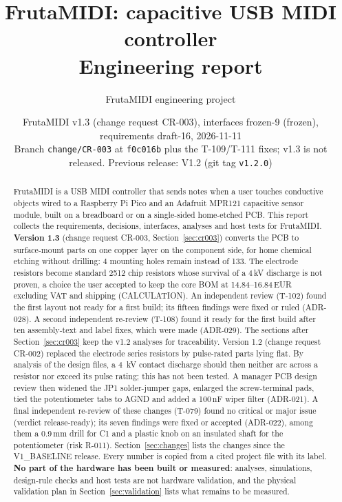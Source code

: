 \documentclass[11pt,a4paper]{article}
\title{FrutaMIDI: capacitive USB MIDI controller\\[2pt]\large Engineering report}
\author{FrutaMIDI engineering project}
\date{FrutaMIDI v1.3 (change request CR-003), interfaces frozen-9 (frozen), requirements draft-16, 2026-11-11\\[2pt]
\small Branch \texttt{change/CR-003} at \texttt{f0c016b} plus the T-109/T-111 fixes; v1.3 is not released.
Previous release: V1.2 (git tag \texttt{v1.2.0})}
\newcommand{\lbl}[1]{\textsc{\small #1}}
\begin{document}
\maketitle

\begin{abstract}
FrutaMIDI is a USB MIDI controller that sends notes when a user touches conductive
objects wired to a Raspberry Pi Pico and an Adafruit MPR121 capacitive sensor
module, built on a breadboard or on a single-sided home-etched PCB.
This report collects the requirements, decisions, interfaces, analyses and host
tests for FrutaMIDI. \textbf{Version 1.3} (change request CR-003,
Section~\ref{sec:cr003}) converts the PCB to surface-mount parts on one copper
layer on the component side, for home chemical etching without drilling: 4
mounting holes remain instead of 133. The electrode resistors become standard
2512 chip resistors whose survival of a 4\,kV discharge is not proven, a choice
the user accepted to keep the core BOM at 14.84--16.84\,EUR excluding VAT and
shipping (\lbl{CALCULATION}). An independent review (T-102) found the first
layout not ready for a first build; its fifteen findings were fixed or ruled
(ADR-028). A second independent re-review (T-108) found it ready for the first
build after ten assembly-text and label fixes, which were made (ADR-029). The sections after Section~\ref{sec:cr003} keep the v1.2 analyses for
traceability. Version 1.2 (change request CR-002) replaced the
electrode series resistors by pulse-rated parts lying flat. By analysis of the
design files, a \qty{4}{\kilo\volt} contact discharge should then neither arc
across a resistor nor exceed its pulse rating; this has not been tested. A
manager PCB design review then widened the JP1 solder-jumper gaps, enlarged the
screw-terminal pads, tied the potentiometer tabs to AGND and added a 100\,nF
wiper filter (ADR-021). A final independent re-review of these changes (T-079)
found no critical or major issue (verdict release-ready); its seven findings were
fixed or accepted (ADR-022), among them a 0.9\,mm drill for C1 and a plastic knob
on an insulated shaft for the potentiometer (risk R-011).
Section~\ref{sec:changes} lists the changes since
the V1\_BASELINE release. Every number is copied from a cited project
file with its label. \textbf{No part of the hardware has been built or measured}:
analyses, simulations, design-rule checks and host tests are not hardware
validation, and the physical validation plan in Section~\ref{sec:validation}
lists what remains to be measured.
\end{abstract}

\tableofcontents
\clearpage















\appendix

\end{document}
